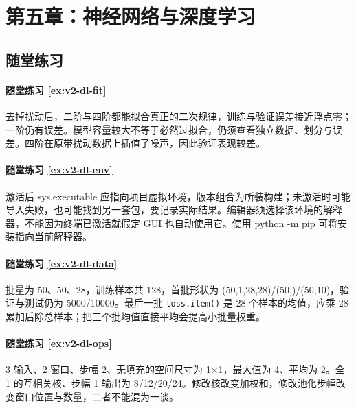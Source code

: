 \section*{第五章：神经网络与深度学习}
\subsection*{随堂练习}

\paragraph*{随堂练习 \ref{ex:v2-dl-fit}}
\begin{solution}
去掉扰动后，二阶与四阶都能拟合真正的二次规律，训练与验证误差接近浮点零；一阶仍有误差。模型容量较大不等于必然过拟合，仍须查看独立数据、划分与误差。四阶在原带扰动数据上插值了噪声，因此验证表现较差。
\end{solution}

\paragraph*{随堂练习 \ref{ex:v2-dl-env}}
\begin{solution}
激活后 sys.executable 应指向项目虚拟环境，版本组合为所装构建；未激活时可能导入失败，也可能找到另一套包，要记录实际结果。编辑器须选择该环境的解释器，不能因为终端已激活就假定 GUI 也自动使用它。使用 python -m pip 可将安装指向当前解释器。
\end{solution}

\paragraph*{随堂练习 \ref{ex:v2-dl-data}}
\begin{solution}
批量为 50、50、28，训练样本共 128，首批形状为 (50,1,28,28)/(50,)/(50,10)，验证与测试仍为 5000/10000。最后一批 \texttt{loss.item()} 是 28 个样本的均值，应乘 28 累加后除总样本；把三个批均值直接平均会提高小批量权重。
\end{solution}

\paragraph*{随堂练习 \ref{ex:v2-dl-ops}}
\begin{solution}
3 输入、2 窗口、步幅 2、无填充的空间尺寸为 1×1，最大值为 4、平均为 2。全 1 的互相关核、步幅 1 输出为 8/12/20/24。修改核改变加权和，修改池化步幅改变窗口位置与数量，二者不能混为一谈。
\end{solution}

